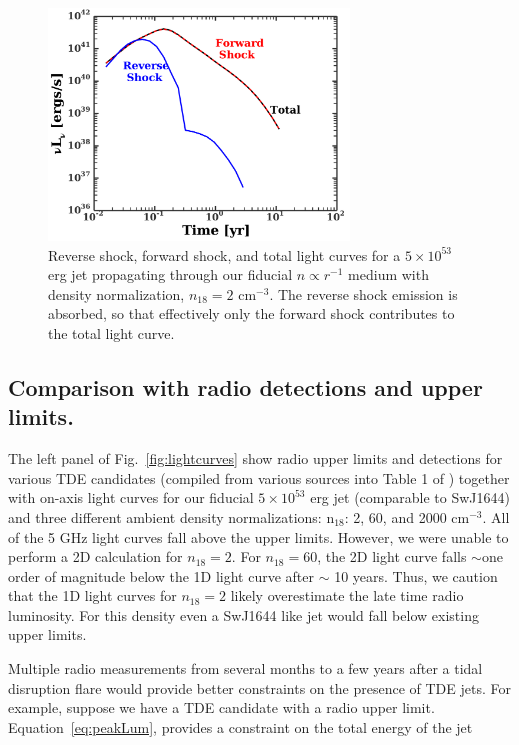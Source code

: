 \documentclass[usenatbib,fleqn]{mnras}
\begin{document}
\begin{figure}
  \includegraphics[width=8cm]{reverse.pdf}
  \caption{\label{fig:reverse} Reverse shock, forward shock, and total
    light curves for a $5\times 10^{53}$ erg jet propagating through
    our fiducial $n\propto r^{-1}$ medium with density normalization,
    $n_{18}=2$ cm$^{-3}$. The reverse shock emission is absorbed, so
    that effectively only the forward shock contributes to the total
    light curve.}
\end{figure}



\subsection{Comparison with radio detections and upper limits.}
The left panel of Fig.~\ref{fig:lightcurves} show radio upper limits and
detections for various TDE candidates (compiled from various sources
into Table 1 of \citealt{Mimica+2015}) together with on-axis light
curves for our fiducial $5\times 10^{53}$ erg jet (comparable to
SwJ1644) and three different ambient density normalizations: n$_{18}$:
2, 60, and 2000 cm$^{-3}$. All of the 5 GHz light curves fall above
the upper limits. However, we were unable to perform a 2D calculation
for $n_{18}=2$.  For $n_{18}=60$, the 2D light curve falls $\sim$one
order of magnitude below the 1D light curve after $\sim$ 10
years. Thus, we caution that the 1D light curves for $n_{18}=2$ likely
overestimate the late time radio luminosity. For this density even a
SwJ1644 like jet would fall below existing upper limits.

Multiple radio measurements from several months to a few years after a
tidal disruption flare would provide better constraints on the
presence of TDE jets. For example, suppose we have a TDE candidate
with a radio upper limit. Equation~\eqref{eq:peakLum}, provides a
constraint on the total energy of the jet
\end{document}
